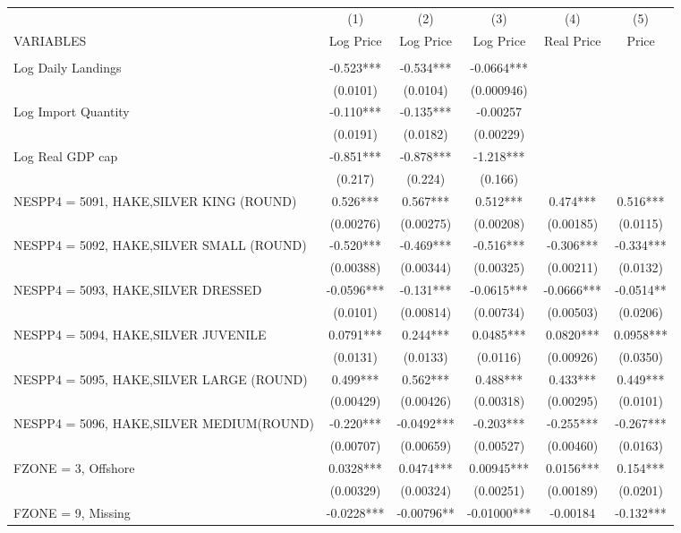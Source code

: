 \begin{tabular}{lccccc} \hline
 & (1) & (2) & (3) & (4) & (5) \\
VARIABLES & Log Price & Log Price & Log Price & Real Price & Price \\ \hline
 &  &  &  &  &  \\
Log Daily Landings & -0.523*** & -0.534*** & -0.0664*** &  &  \\
 & (0.0101) & (0.0104) & (0.000946) &  &  \\
Log Import Quantity & -0.110*** & -0.135*** & -0.00257 &  &  \\
 & (0.0191) & (0.0182) & (0.00229) &  &  \\
Log Real GDP cap & -0.851*** & -0.878*** & -1.218*** &  &  \\
 & (0.217) & (0.224) & (0.166) &  &  \\
NESPP4 = 5091, HAKE,SILVER KING (ROUND) & 0.526*** & 0.567*** & 0.512*** & 0.474*** & 0.516*** \\
 & (0.00276) & (0.00275) & (0.00208) & (0.00185) & (0.0115) \\
NESPP4 = 5092, HAKE,SILVER SMALL (ROUND) & -0.520*** & -0.469*** & -0.516*** & -0.306*** & -0.334*** \\
 & (0.00388) & (0.00344) & (0.00325) & (0.00211) & (0.0132) \\
NESPP4 = 5093, HAKE,SILVER DRESSED & -0.0596*** & -0.131*** & -0.0615*** & -0.0666*** & -0.0514** \\
 & (0.0101) & (0.00814) & (0.00734) & (0.00503) & (0.0206) \\
NESPP4 = 5094, HAKE,SILVER JUVENILE & 0.0791*** & 0.244*** & 0.0485*** & 0.0820*** & 0.0958*** \\
 & (0.0131) & (0.0133) & (0.0116) & (0.00926) & (0.0350) \\
NESPP4 = 5095, HAKE,SILVER LARGE (ROUND) & 0.499*** & 0.562*** & 0.488*** & 0.433*** & 0.449*** \\
 & (0.00429) & (0.00426) & (0.00318) & (0.00295) & (0.0101) \\
NESPP4 = 5096, HAKE,SILVER MEDIUM(ROUND) & -0.220*** & -0.0492*** & -0.203*** & -0.255*** & -0.267*** \\
 & (0.00707) & (0.00659) & (0.00527) & (0.00460) & (0.0163) \\
FZONE = 3, Offshore & 0.0328*** & 0.0474*** & 0.00945*** & 0.0156*** & 0.154*** \\
 & (0.00329) & (0.00324) & (0.00251) & (0.00189) & (0.0201) \\
FZONE = 9, Missing & -0.0228*** & -0.00796** & -0.01000*** & -0.00184 & -0.132*** \\

\end{tabular}
